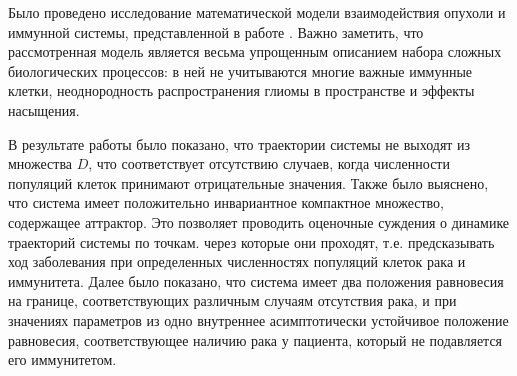 \documentclass[14pt,a4paper]{extarticle}
\begin{document}
	\begin{conclusion}
		
	Было проведено исследование математической модели взаимодействия опухоли и иммунной системы, представленной в работе \cite{model}. Важно заметить, что рассмотренная модель является весьма упрощенным описанием набора сложных биологических процессов: в ней не учитываются многие важные иммунные клетки, неоднородность распространения глиомы в пространстве и эффекты насыщения.
	
	В результате работы было показано, что траектории системы не выходят из множества $D$, что соответствует отсутствию случаев, когда численности популяций клеток принимают отрицательные значения. Также было выяснено, что система имеет положительно инвариантное компактное множество, содержащее аттрактор. Это позволяет проводить оценочные суждения о динамике траекторий системы по точкам. через которые они проходят, т.е. предсказывать ход заболевания при определенных численностях популяций клеток рака и иммунитета. Далее было показано, что система имеет два положения равновесия на границе, соответствующих различным случаям отсутствия рака, и при значениях параметров из \cite{model} одно внутреннее асимптотически устойчивое положение равновесия, соответствующее наличию рака у пациента, который не подавляется его иммунитетом. 
	
	\end{conclusion}
	
\end{document}

